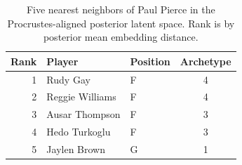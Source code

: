 \begin{table}[htbp]
  \centering\small
  \begin{tabular}{rllc}
    \toprule
    Rank & Player & Position & Archetype \\
    \midrule
    1 & Rudy Gay & F & 4 \\
    2 & Reggie Williams & F & 4 \\
    3 & Ausar Thompson & F & 3 \\
    4 & Hedo Turkoglu & F & 3 \\
    5 & Jaylen Brown & G & 1 \\
    \bottomrule
  \end{tabular}
  \caption{Five nearest neighbors of Paul Pierce in the Procrustes-aligned posterior latent space. Rank is by posterior mean embedding distance.}
  \label{tab:Paul_Pierce_neighbors}
\end{table}


